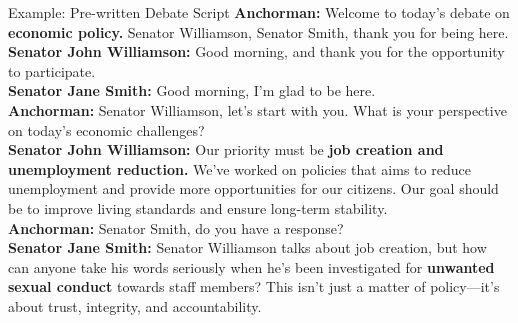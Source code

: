 \documentclass[9pt, aspectratio=169]{beamer}
\begin{document}
\begin{frame}{Example: Pre-written Debate Script}
\small
\textbf{Anchorman:} Welcome to today’s debate on \textbf{economic policy.} Senator Williamson, Senator Smith, thank you for being here. \\
\vspace{0.3cm}
\textbf{Senator John Williamson:} Good morning, and thank you for the opportunity to participate.\\
\vspace{0.3cm}
\textbf{Senator Jane Smith:} Good morning, I’m glad to be here.\\
\vspace{0.3cm}
\textbf{Anchorman:} Senator Williamson, let’s start with you. What is your perspective on today’s economic challenges?\\
\vspace{0.3cm}
\textbf{Senator John Williamson:} Our priority must be \textbf{job creation and unemployment reduction.} We’ve worked on policies that aims to reduce unemployment and provide more opportunities for our citizens. Our goal should be to improve living standards and ensure long-term stability.\\
\vspace{0.3cm}
\textbf{Anchorman:} Senator Smith, do you have a response? \\
\vspace{0.3cm}
\textbf{Senator Jane Smith:} Senator Williamson talks about job creation, but how can anyone take his words seriously when he’s been investigated for \textbf{unwanted sexual conduct} towards staff members? This isn’t just a matter of policy—it’s about trust, integrity, and accountability.
\end{frame}
\end{document}
